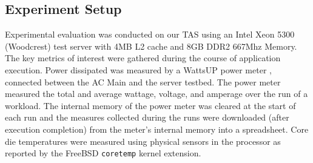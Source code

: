 \documentclass[times, 10pt,twocolumn]{IEEEtran}
\begin{document}
\subsection{Experiment Setup}
\label{sec:experiment-setup} 
Experimental evaluation was conducted on our TAS using an Intel Xeon 5300
(Woodcrest) test server with 4MB L2 cache and 8GB DDR2 667Mhz Memory.
The key metrics of interest were gathered during the course of
application execution.  Power dissipated was measured by a WattsUP power
meter \cite{WattsUp2006a}, connected between the AC Main and the server
testbed.  The power meter measured the total and average wattage,
voltage, and amperage over the run of a workload.  The internal memory
of the power meter was cleared at the start of each run and the measures
collected during the runs were downloaded (after execution completion)
from the meter's internal memory into a spreadsheet.   Core die
temperatures were measured using physical sensors in the processor as
reported by the FreeBSD \texttt{coretemp} kernel extension.
\end{document}

